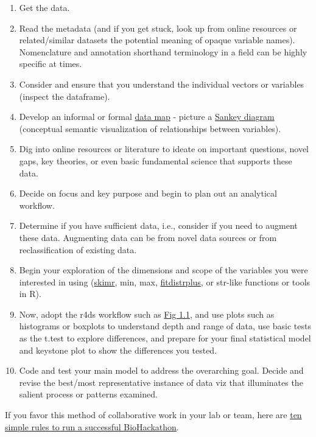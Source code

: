 \documentclass[
]{book}
\begin{document}
\begin{enumerate}
\def\labelenumi{\arabic{enumi}.}
\item
  Get the data.
\item
  Read the metadata (and if you get stuck, look up from online resources or related/similar datasets the potential meaning of opaque variable names). Nomenclature and annotation shorthand terminology in a field can be highly specific at times.
\item
  Consider and ensure that you understand the individual vectors or variables (inspect the dataframe).
\item
  Develop an informal or formal \href{https://www.integrate.io/blog/data-mapping-an-overview-of-data-mapping-and-its-technology/}{data map} - picture a \href{https://www.data-to-viz.com/graph/sankey.html}{Sankey diagram} (conceptual semantic visualization of relationships between variables).
\item
  Dig into online resources or literature to ideate on important questions, novel gaps, key theories, or even basic fundamental science that supports these data.
\item
  Decide on focus and key purpose and begin to plan out an analytical workflow.
\item
  Determine if you have sufficient data, i.e., consider if you need to augment these data. Augmenting data can be from novel data sources or from reclassification of existing data.
\item
  Begin your exploration of the dimensions and scope of the variables you were interested in using (\href{https://cran.r-project.org/web/packages/skimr/vignettes/skimr.html}{skimr}, min, max, \href{https://cran.r-project.org/web/packages/fitdistrplus/index.html}{fitdistrplus}, or str-like functions or tools in R).
\item
  Now, adopt the r4ds workflow such as \href{https://r4ds.had.co.nz/introduction.html}{Fig 1.1}, and use plots such as histograms or boxplots to understand depth and range of data, use basic tests as the t.test to explore differences, and prepare for your final statistical model and keystone plot to show the differences you tested.
\item
  Code and test your main model to address the overarching goal. Decide and revise the best/most representative instance of data viz that illuminates the salient process or patterns examined.
\end{enumerate}

If you favor this method of collaborative work in your lab or team, here are \href{https://journals.plos.org/ploscompbiol/article?id=10.1371/journal.pcbi.1007808}{ten simple rules to run a successful BioHackathon}.
\end{document}

